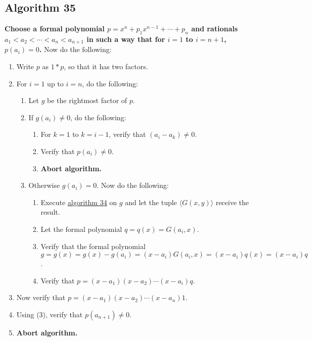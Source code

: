 \documentclass[twocolumn]{article}
\begin{document}
		\subsection{Algorithm 35}\label{sec:algorithm 35}
			\textbf{Choose a formal polynomial $p=x^n+p_1x^{n-1}+\cdots+p_n$ and rationals $a_1<a_2<\cdots<a_n<a_{n+1}$ in such a way that for $i=1$ to $i=n+1$, $p(a_i)=0$.} Now do the following:
			\begin{enumerate}
				\item Write $p$ as $1*p$, so that it has two factors.
				\item For $i=1$ up to $i=n$, do the following:
				\begin{enumerate}
					\item Let $g$ be the rightmost factor of $p$.
					\item If $g(a_i)\ne 0$, do the following:
					\begin{enumerate}
						\item For $k=1$ to $k=i-1$, verify that $(a_i-a_k)\ne 0$.
						\item Verify that $p(a_i)\ne 0$.
						\item \textbf{Abort algorithm.}
					\end{enumerate}
					\item Otherwise $g(a_i)=0$. Now do the following:
					\begin{enumerate}
						\item Execute \hyperref[sec:algorithm 34]{algorithm 34} on $g$ and let the tuple $\langle G(x,y)\rangle$ receive the result.
						\item Let the formal polynomial $q=q(x)=G(a_i,x)$.
						\item Verify that the formal polynomial $g=g(x)=g(x)-g(a_i)=(x-a_i)G(a_i,x)=(x-a_i)q(x)=(x-a_i)q$.
						\item Verify that $p=(x-a_1)(x-a_2)\cdots(x-a_i)q$.
					\end{enumerate}
				\end{enumerate}
				\item Now verify that $p=(x-a_1)(x-a_2)\cdots(x-a_n)1$.
				\item Using (3), verify that $p(a_{n+1})\ne 0$.
				\item \textbf{Abort algorithm.}
			\end{enumerate}
\end{document}
